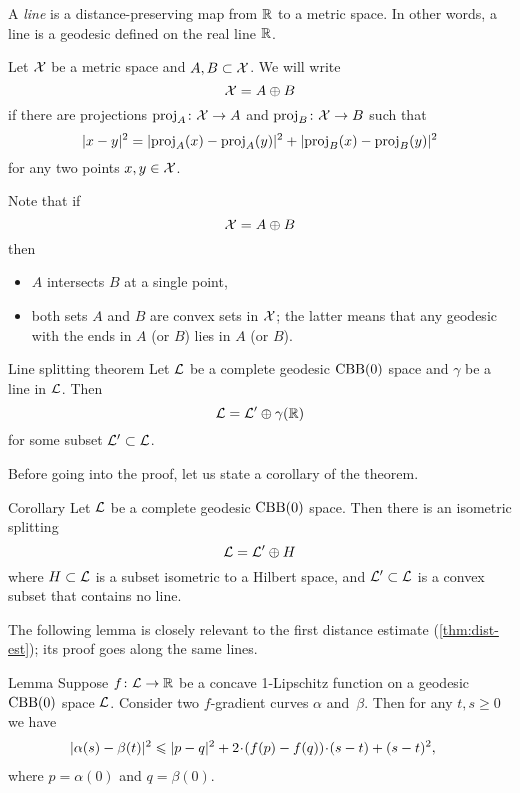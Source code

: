 A \emph{line} is a distance-preserving map
from $\mathbb{R}$ to a metric space.
In other words, a line is a geodesic defined on the real line $\mathbb{R}$.


Let $\mathcal{X}$ be a metric space and $A,B\subset \mathcal{X}$.
We will write 
\[\mathcal{X}=A\oplus B\]
if there are projections $\operatorname{\rm proj}\nolimits_A\colon\mathcal{X}\to A$ 
and 
$\operatorname{\rm proj}\nolimits_B\colon\mathcal{X}\to B$
such that 
\[\dist[2]{x}{y}{}=\dist[2]{\proj_A(x)}{\proj_A(y)}{}+\dist[2]{\proj_B(x)}{\proj_B(y)}{}\]
for any two points $x,y\in \mathcal{X}$.

Note that if 
\[\mathcal{X}=A\oplus B\]
then 
\begin{itemize}
\item $A$ intersects $B$ at a single point,
\item both sets $A$ and $B$ are convex sets in $\mathcal{X}$;
the latter means that any geodesic with the ends in $A$ (or $B$) lies in $A$ (or $B$). 
\end{itemize}

\begin{thm}{Line splitting theorem}\label{thm:splitting}
Let $\mathcal{L}$  be a complete geodesic $\mathrm{CBB}(0)$ space
and $\gamma$ be a line in $\mathcal{L}$. 
Then 
\[\mathcal{L}=\mathcal{L}'\oplus \gamma(\mathbb{R})\]
for some subset $\mathcal{L}'\subset \mathcal{L}$.
\end{thm}

Before going into the proof, let us state a corollary of the theorem.

\begin{thm}{Corollary}\label{cor:splitting}
Let $\mathcal{L}$ be a complete geodesic $\mathrm{CBB}(0)$ space. 
Then there is an isometric splitting
\[
\mathcal{L}=\mathcal{L}'\oplus H
\]
where $H\subset \mathcal{L}$ is a subset isometric to a Hilbert space, and $\mathcal{L}'\subset \mathcal{L}$ is a convex subset that contains no line. 
\end{thm}

The following lemma is closely relevant to the first distance estimate (\ref{thm:dist-est}); its proof goes along the same lines.

\begin{thm}{Lemma}\label{lem:dist-estimate}
Suppose $f\colon\mathcal{L}\to\mathbb{R}$ be a concave 1-Lipschitz function on a geodesic $\mathrm{CBB}(0)$ space $\mathcal{L}$.
Consider two $f$-gradient curves $\alpha$ and~$\beta$.
Then for any $t, s\ge 0$ we have
\begin{align*}
&\dist[2]{\alpha(s)}{\beta(t)}{}
\le 
\dist[2]{p}{q}{}+
2\cdot(f(p)-f(q))\cdot(s-t)+ (s-t)^2,
\end{align*}
where $p=\alpha(0)$ and $q=\beta(0)$.
\end{thm}

